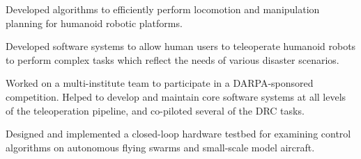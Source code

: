 \documentclass[10pt,a4paper,ragged2e]{altacv}
\begin{document}
Developed algorithms to efficiently perform locomotion and manipulation planning for humanoid robotic platforms.

\divider

Developed software systems to allow human users to teleoperate humanoid robots to perform complex tasks which reflect the needs of various disaster scenarios.

\divider

Worked on a multi-institute team to participate in a DARPA-sponsored competition. Helped to develop and maintain core software systems at all levels of the teleoperation pipeline, and co-piloted several of the DRC tasks.

\divider

Designed and implemented a closed-loop hardware testbed for examining control algorithms on autonomous flying swarms and small-scale model aircraft.

\clearpage


\nocite{*}


\printbibliography[heading=pubtype,title={\printinfo{\faBook}{Doctoral Thesis}},type=thesis]

\divider

\printbibliography[heading=pubtype,title={\printinfo{\faFileTextO}{Journal Article}},type=article]

\divider

\printbibliography[heading=pubtype,title={\printinfo{\faGroup}{Conference Proceedings}},type=inproceedings]


\end{document}
